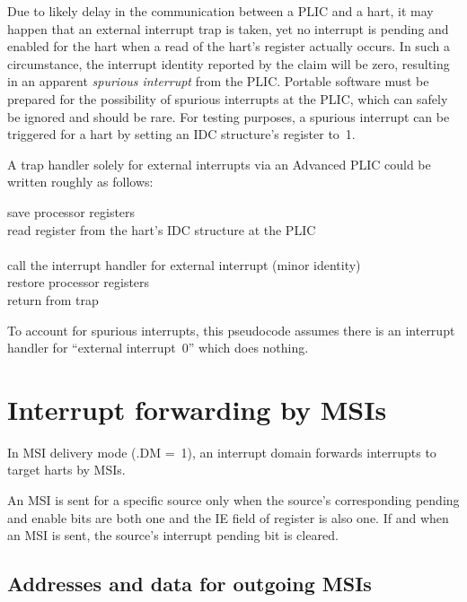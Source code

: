Due to likely delay in the communication between a PLIC and a hart, it
may happen that an external interrupt trap is taken, yet no interrupt
is pending and enabled for the hart when a read of the hart's
 register actually occurs.
In such a circumstance, the interrupt identity reported by the claim
will be zero, resulting in an apparent \emph{spurious interrupt} from
the PLIC.
Portable software must be prepared for the possibility of spurious
interrupts at the PLIC, which can safely be ignored and should be rare.
For testing purposes, a spurious interrupt can be triggered for a hart
by setting an IDC structure's  register to~1.

A trap handler solely for external interrupts via an Advanced PLIC
could be written roughly as follows:

\begin{displayLinesTable}
save processor registers \\
read register  from the hart's IDC structure at the PLIC \\
 \\
call the interrupt handler for external interrupt  (minor identity) \\
restore processor registers \\
return from trap \\
\end{displayLinesTable}
To account for spurious interrupts, this pseudocode assumes there is an
interrupt handler for ``external interrupt~0'' which does nothing.

\section{Interrupt forwarding by MSIs}

In MSI delivery mode (.DM =~1), an interrupt domain
forwards interrupts to target harts by MSIs.

An MSI is sent for a specific source only when the source's
corresponding pending and enable bits are both one and the IE field of
register  is also one.
If and when an MSI is sent, the source's interrupt pending bit is
cleared.

\subsection{Addresses and data for outgoing MSIs}
\label{sec:AdvPLIC-MSIAddrs}

